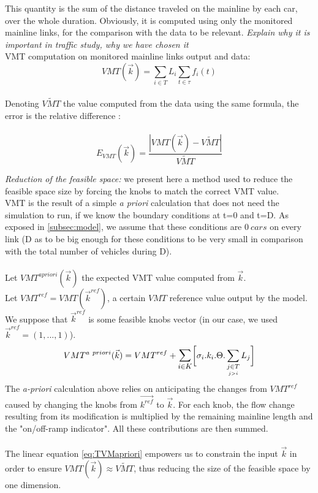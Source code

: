 This quantity is the sum of the distance traveled on the mainline by each car, over the whole duration.
Obviously, it is computed using only the monitored mainline links, for the comparison with the data to be relevant.
\emph{Explain why it is important in traffic study, why we have chosen it} 
\\
VMT computation on monitored mainline links output and data:
\begin{equation*}
	 VMT(\vec{k})=\sum_{i\in{T}}L_{i}\sum_{t\in \tau}f_{i}(t)
\end{equation*}
\\
Denoting $\widetilde{VMT}$ the value computed from the data using the same formula, the error is the relative difference :\\
\\
\begin{equation*}
	E_{VMT}(\vec{k})=\frac{|VMT(\vec{k})-\widetilde{VMT}|}{\widetilde{VMT}}
\end{equation*}

\emph{Reduction of the feasible space:} we present here a method used to reduce the feasible space size by forcing the knobs to match the correct VMT value.\\
VMT is the result of a simple \emph{a priori} calculation that does not need the simulation to run, if we know the boundary conditions at t=0 and t=D. As exposed in \ref{subsec:model}, we assume that these conditions are $0\ cars$ on every link (D as to be big enough for these conditions to be very small in comparison with the total number of vehicles during D).\\
\\
Let $VMT^{a priori}(\vec{k})$ the expected VMT value computed from $\vec{k}$.\\
Let $VMT^{ref}=VMT(\vec{k}^{ref})$, a certain $VMT$ reference value output by the model. We suppose that $\vec{k}^{ref}$ is some feasible knobs vector (in our case, we used $\vec{k}^{ref}=(1,...,1)$).\\
\begin{equation}
	\label{eq:TVMapriori}
	VMT^{a\ priori}(\vec{k})=VMT^{ref}+\mathlarger{\sum\limits_{i\in K}}\biggl[\sigma_{i}.k_{i}.\Theta.	\sum\limits_{\underset{j>i}{j\in T}}L_{j}\biggr]
\end{equation}	
The \emph{a-priori} calculation above relies on anticipating the changes from $VMT^{ref}$ caused by changing the knobs from $\vec{k^{ref}}$ to $\vec{k}$. For each knob, the flow change resulting from its modification is multiplied by the remaining mainline length and the "on/off-ramp indicator". All these contributions are then summed.\\
\\


The linear equation \ref{eq:TVMapriori} empowers us to constrain the input $\vec{k}$ in order to ensure $VMT(\vec{k})\approx \widetilde{VMT}$, thus reducing the size of the feasible space by one dimension.\\